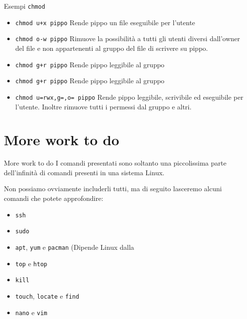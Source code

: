 \documentclass{beamer}
\begin{document}
\begin{frame}{Esempi \texttt{chmod}}
  \begin{itemize}
    \item \texttt{chmod u+x pippo} Rende pippo un file eseguibile per l'utente
    \item \texttt{chmod o-w pippo} Rimuove la possibilità a tutti gli utenti
      diversi dall'owner del file e non appartenenti al gruppo del file di 
      scrivere su pippo.
    \item \texttt{chmod g+r pippo} Rende pippo leggibile al gruppo
    \item \texttt{chmod g+r pippo} Rende pippo leggibile al gruppo
    \item \texttt{chmod u=rwx,g=,o= pippo} Rende pippo leggibile, scrivibile ed
      eseguibile per l'utente. Inoltre rimuove tutti i permessi dal gruppo e 
      altri.
  \end{itemize}
\end{frame}

\section{More work to do}
\begin{frame}{More work to do}
  I comandi presentati sono soltanto una piccolissima parte dell'infinità di 
  comandi presenti in una sistema Linux.\bigskip 

  Non possiamo ovviamente includerli tutti, ma di seguito lasceremo alcuni 
  comandi che potete approfondire:
  \begin{itemize}
    \item \texttt{ssh}
    \item \texttt{sudo}
    \item \texttt{apt}, \texttt{yum} e \texttt{pacman} (Dipende Linux dalla 
    \item \texttt{top} e \texttt{htop}
    \item \texttt{kill}
    \item \texttt{touch}, \texttt{locate} e  \texttt{find} 
    \item \texttt{nano} e \texttt{vim}
  \end{itemize}
\end{frame}
\end{document}
